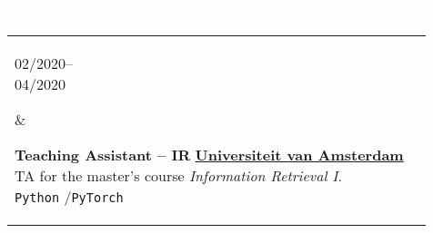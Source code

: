 \documentclass{article}
\newcommand{\cvsect}[1]{
	\vspace{0.5\baselineskip}
	\colorbox{primary}{\textcolor{white}{\MakeUppercase{\textbf{#1}}}}\\
}
\newenvironment{entrylist}{
	\begin{longtable}[H]{l l}
}{
	\end{longtable}
}
\newcommand{\entry}[4]{%
	\parbox[t]{0.175\linewidth}{#1} &
	\parbox[t]{0.825\linewidth}{
		\textbf{#2}%
		\hfill%
		{\footnotesize \textbf{\textcolor{black}{#3}}}\\%
		{\small #4} %
    }\\\\}
\newcommand{\slashsep}{\hspace{2mm}/\hspace{2mm}}
\begin{document}
\cvsect{Experience}
\begin{entrylist}
    \entry
    {02/2020--\\04/2020}
    {Teaching Assistant -- IR}
    {\href{https://uva.nl/}{Universiteit van Amsterdam}}
    {
        TA for the master's course \textit{Information Retrieval I}.\\
        \texttt{Python} \slashsep \texttt{PyTorch}
    }

    \entry
    {01/2020--\\02/2020}
    {Teaching Assistant -- FACT}
    {\href{https://uva.nl/}{Universiteit van Amsterdam}}
    {
        TA for the masters course \textit{Fairness, Accountability, Confidentiality and Transparency in AI}.\\
        \texttt{Python} \slashsep \texttt{PyTorch}
    }


    \entry
    {06/2019--\\08/2019}
    {Internship -- AI for production control}
    {\href{https://www.bmwgroup.com}{BMW Group, Munich}}
    {
        Worked within the engine development department.
        Building statistical models to analyze engine part quality and live fleet monitoring.
        Building a production ready data visualization app.\\
        \texttt{Python}\slashsep\texttt{PySpark}\slashsep\texttt{Palantir Foundry}\slashsep\texttt{PostgreSQL}\slashsep\texttt{Dash}\slashsep\texttt{Agile development}
    }

    \entry
    {04/2018--\\08/2018}
    {Full-stack Web developer}
    {\href{https://buergerwerke.de/}{Bürgerwerke eG, Heidelberg}}
    {
        Ground-up development of a communication and organization web portal in Ruby on Rails. Backend and Frontend work, idea to finish.\\
        \texttt{Rails}\slashsep\texttt{Ruby}
    }


\end{entrylist}
\end{document}

